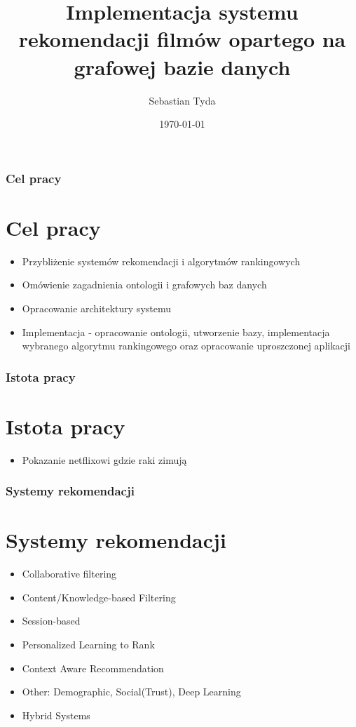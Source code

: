 \documentclass{beamer}
\title[]{Implementacja systemu rekomendacji filmów opartego na grafowej bazie danych}
\institute[UMCS]
{
	Uniwersytet Marii Curie Skłodowskiej
	\medskip
}
\author{Sebastian Tyda}
\date{\today}
\begin{document}
	\begin{frame}
		\titlepage
	\end{frame}
	\begin{frame}
		\frametitle{Cel pracy}
		\section{Cel pracy}
		\begin{itemize}
			\item Przybliżenie systemów rekomendacji i algorytmów rankingowych
			\item Omówienie zagadnienia ontologii i grafowych baz danych
			\item Opracowanie architektury systemu
			\item Implementacja - opracowanie ontologii, utworzenie bazy, implementacja wybranego algorytmu rankingowego oraz opracowanie uproszczonej aplikacji
		\end{itemize}
	\end{frame}

	\begin{frame}
		\frametitle{Istota pracy}
		\section{Istota pracy}
		\begin{itemize}
			\item Pokazanie netflixowi gdzie raki zimują
		\end{itemize}
	\end{frame}

	\begin{frame}
		\frametitle{Systemy rekomendacji}
		\section{Systemy rekomendacji}
		\begin{itemize}
			\item Collaborative filtering
			\item Content/Knowledge-based Filtering
			\item Session-based
			\item Personalized Learning to Rank
			\item Context Aware Recommendation
			\item Other: Demographic, Social(Trust), Deep Learning
			\item Hybrid Systems
		\end{itemize}
	\end{frame}
\end{document}
